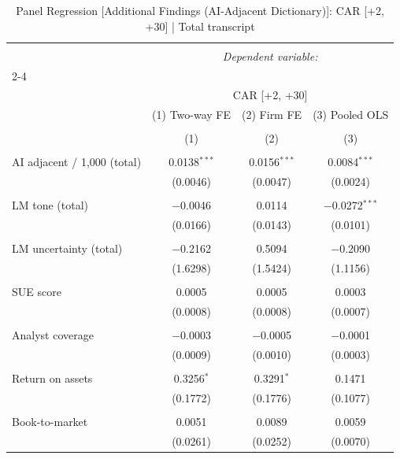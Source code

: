 
\begin{table}[!htbp] \centering 
  \caption{Panel Regression [Additional Findings (AI-Adjacent Dictionary)]: CAR [+2, +30]  |  Total transcript} 
  \label{} 
\begin{tabular}{@{\extracolsep{5pt}}lccc} 
\\[-1.8ex]\hline 
\hline \\[-1.8ex] 
 & \multicolumn{3}{c}{\textit{Dependent variable:}} \\ 
\cline{2-4} 
\\[-1.8ex] & \multicolumn{3}{c}{CAR [+2, +30]} \\ 
 & (1) Two-way FE & (2) Firm FE & (3) Pooled OLS \\ 
\\[-1.8ex] & (1) & (2) & (3)\\ 
\hline \\[-1.8ex] 
 AI adjacent / 1,000 (total) & 0.0138$^{***}$ & 0.0156$^{***}$ & 0.0084$^{***}$ \\ 
  & (0.0046) & (0.0047) & (0.0024) \\ 
  & & & \\ 
 LM tone (total) & $-$0.0046 & 0.0114 & $-$0.0272$^{***}$ \\ 
  & (0.0166) & (0.0143) & (0.0101) \\ 
  & & & \\ 
 LM uncertainty (total) & $-$0.2162 & 0.5094 & $-$0.2090 \\ 
  & (1.6298) & (1.5424) & (1.1156) \\ 
  & & & \\ 
 SUE score & 0.0005 & 0.0005 & 0.0003 \\ 
  & (0.0008) & (0.0008) & (0.0007) \\ 
  & & & \\ 
 Analyst coverage & $-$0.0003 & $-$0.0005 & $-$0.0001 \\ 
  & (0.0009) & (0.0010) & (0.0003) \\ 
  & & & \\ 
 Return on assets & 0.3256$^{*}$ & 0.3291$^{*}$ & 0.1471 \\ 
  & (0.1772) & (0.1776) & (0.1077) \\ 
  & & & \\ 
 Book-to-market & 0.0051 & 0.0089 & 0.0059 \\ 
  & (0.0261) & (0.0252) & (0.0070) \\ 

\end{tabular}
\end{table}
